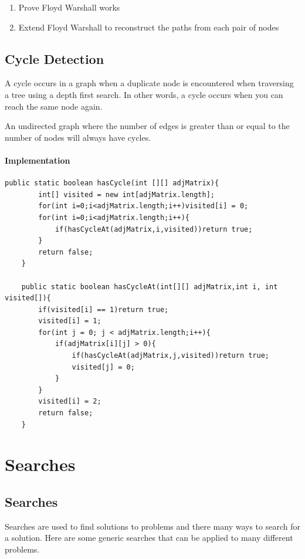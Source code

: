 \documentclass[11pt,oneside]{book}
\begin{document}
\begin{enumerate}
\item Prove Floyd Warshall works
\item Extend Floyd Warshall to reconstruct the paths from each pair of nodes
\end{enumerate}

    \chapter{ Cycle Detection }
    

A cycle occurs in a graph when a duplicate node is encountered when traversing a tree using a depth first search. In other words, a cycle occurs when you can reach the same node again.

An undirected graph where the number of edges is greater than or equal to the number of nodes will always have cycles.

\subsection{Implementation}

\begin{lstlisting}
public static boolean hasCycle(int [][] adjMatrix){
        int[] visited = new int[adjMatrix.length];
        for(int i=0;i<adjMatrix.length;i++)visited[i] = 0;
        for(int i=0;i<adjMatrix.length;i++){
            if(hasCycleAt(adjMatrix,i,visited))return true;
        }
        return false;
    }
    
    public static boolean hasCycleAt(int[][] adjMatrix,int i, int visited[]){
        if(visited[i] == 1)return true;
        visited[i] = 1;
        for(int j = 0; j < adjMatrix.length;i++){
            if(adjMatrix[i][j] > 0){
                if(hasCycleAt(adjMatrix,j,visited))return true;
                visited[j] = 0;
            }
        }
        visited[i] = 2;
        return false;
    }
\end{lstlisting}

\part{ Searches }
    \chapter{ Searches }
        

Searches are used to find solutions to problems and there many ways to search for a solution. Here are some generic searches that can be applied to many different problems.
\end{document}
